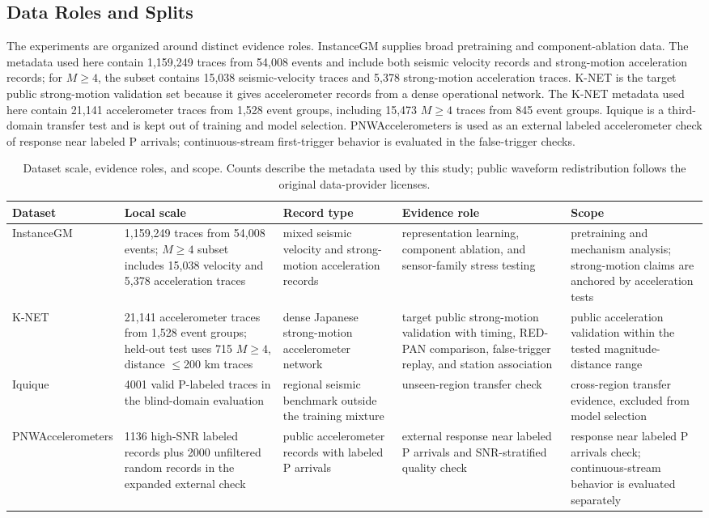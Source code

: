\documentclass[journal]{IEEEtran}
\newcommand{\tgrsdensetablesetup}{\footnotesize\setlength{\tabcolsep}{2.0pt}\renewcommand{\arraystretch}{1.06}}
\begin{document}
\subsection{Data Roles and Splits}
The experiments are organized around distinct evidence roles. InstanceGM supplies broad pretraining and component-ablation data. The metadata used here contain 1,159,249 traces from 54,008 events and include both seismic velocity records and strong-motion acceleration records; for $M\geq4$, the subset contains 15,038 seismic-velocity traces and 5,378 strong-motion acceleration traces. K-NET is the target public strong-motion validation set because it gives accelerometer records from a dense operational network. The K-NET metadata used here contain 21,141 accelerometer traces from 1,528 event groups, including 15,473 $M\geq4$ traces from 845 event groups. Iquique is a third-domain transfer test and is kept out of training and model selection. PNWAccelerometers is used as an external labeled accelerometer check of response near labeled P arrivals; continuous-stream first-trigger behavior is evaluated in the false-trigger checks.

\begin{table}[!t]
\centering
\caption{Dataset scale, evidence roles, and scope. Counts describe the metadata used by this study; public waveform redistribution follows the original data-provider licenses.}
\label{tab:dataset_roles}
{\tgrsdensetablesetup
\begin{tabular}{@{}p{}p{}p{}p{}p{}@{}}
\toprule
Dataset & Local scale & Record type & Evidence role & Scope\\
\midrule
InstanceGM & 1,159,249 traces from 54,008 events; $M\geq4$ subset includes 15,038 velocity and 5,378 acceleration traces & mixed seismic velocity and strong-motion acceleration records & representation learning, component ablation, and sensor-family stress testing & pretraining and mechanism analysis; strong-motion claims are anchored by acceleration tests\\
K-NET & 21,141 accelerometer traces from 1,528 event groups; held-out test uses 715 $M\geq4$, distance $\leq$200 km traces & dense Japanese strong-motion accelerometer network & target public strong-motion validation with timing, RED-PAN comparison, false-trigger replay, and station association & public acceleration validation within the tested magnitude-distance range\\
Iquique & 4001 valid P-labeled traces in the blind-domain evaluation & regional seismic benchmark outside the training mixture & unseen-region transfer check & cross-region transfer evidence, excluded from model selection\\
PNWAccelerometers & 1136 high-SNR labeled records plus 2000 unfiltered random records in the expanded external check & public accelerometer records with labeled P arrivals & external response near labeled P arrivals and SNR-stratified quality check & response near labeled P arrivals check; continuous-stream behavior is evaluated separately\\
\bottomrule
\end{tabular}}
\end{table}
\end{document}
